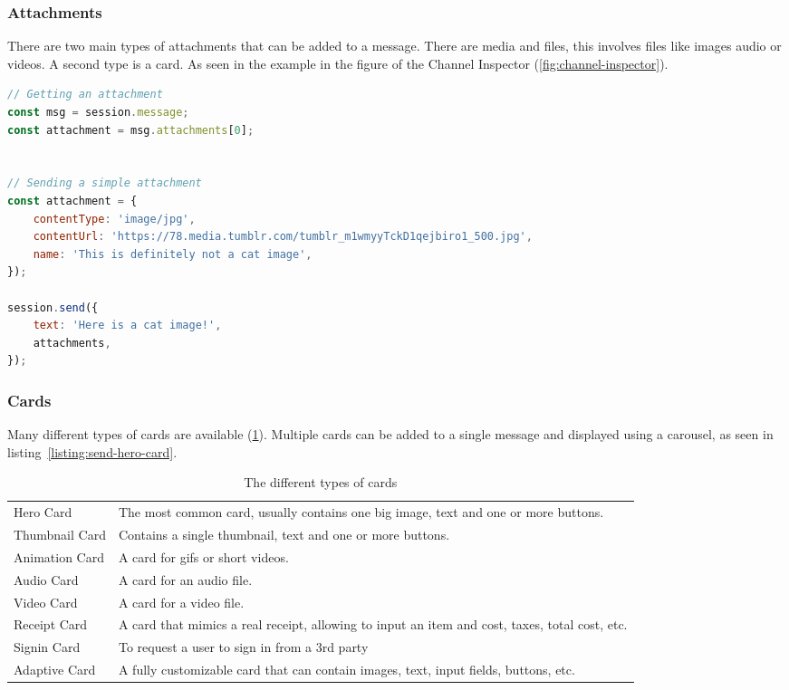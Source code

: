 \subsubsection{Attachments}

There are two main types of attachments that can be added to a message. There are media and files, this involves files like images audio or videos. A second type is a card. As seen in the example in the figure of the Channel Inspector (\ref{fig:channel-inspector}).

\begin{lstlisting}[language=JavaScript,caption={Receiving an attachment from the user and sending an image},label=listing:receive-attachment]
// Getting an attachment
const msg = session.message;
const attachment = msg.attachments[0];


// Sending a simple attachment
const attachment = {
	contentType: 'image/jpg',
	contentUrl: 'https://78.media.tumblr.com/tumblr_m1wmyyTckD1qejbiro1_500.jpg',
	name: 'This is definitely not a cat image',
});

session.send({
	text: 'Here is a cat image!',
	attachments,
});
\end{lstlisting}

\subsubsection{Cards}

Many different types of cards are available (\ref{tab:card-types}). Multiple cards can be added to a single message and displayed using a carousel, as seen in listing~\ref{listing:send-hero-card}.

\renewcommand{\arraystretch}{2}
\begin{table}[ht]
	\centering
	\begin{tabular}{p{} |p{}}
		Hero Card      & The most common card, usually contains one big image, text and one or more buttons.            \\
		Thumbnail Card & Contains a single thumbnail, text and one or more buttons.                                     \\
		Animation Card & A card for gifs or short videos.                                                               \\
		Audio Card     & A card for an audio file.                                                                      \\
		Video Card     & A card for a video file.                                                                       \\
		Receipt Card   & A card that mimics a real receipt, allowing to input an item and cost, taxes, total cost, etc. \\
		Signin Card    & To request a user to sign in from a 3rd party                                                  \\
		Adaptive Card  & A fully customizable card that can contain images, text, input fields, buttons, etc.           \\
	\end{tabular}
	\caption{The different types of cards}
	\label{tab:card-types}
\end{table}

